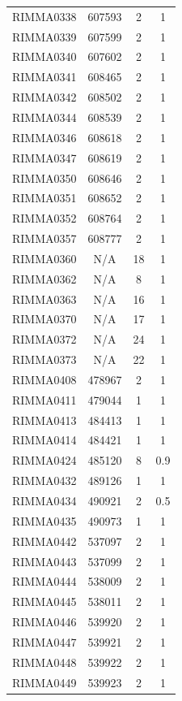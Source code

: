 \documentclass[11pt]{article}
\newcounter{rowno}
\begin{document}
\begin{scriptsize}
\begin{longtable}{>{\stepcounter{rowno}}cccc}
    RIMMA0338 & 607593 & 2     & 1 \\
    RIMMA0339 & 607599 & 2     & 1 \\
    RIMMA0340 & 607602 & 2     & 1 \\
    RIMMA0341 & 608465 & 2     & 1 \\
    RIMMA0342 & 608502 & 2     & 1 \\
    RIMMA0344 & 608539 & 2     & 1 \\
    RIMMA0346 & 608618 & 2     & 1 \\
    RIMMA0347 & 608619 & 2     & 1 \\
    RIMMA0350 & 608646 & 2     & 1 \\
    RIMMA0351 & 608652 & 2     & 1 \\
    RIMMA0352 & 608764 & 2     & 1 \\
    RIMMA0357 & 608777 & 2     & 1 \\
    RIMMA0360 & N/A & 18    & 1 \\
    RIMMA0362 & N/A & 8     & 1 \\
    RIMMA0363 & N/A & 16    & 1 \\
    RIMMA0370 & N/A & 17    & 1 \\
    RIMMA0372 & N/A & 24    & 1 \\
    RIMMA0373 & N/A & 22    & 1 \\
    RIMMA0408 & 478967 & 2     & 1 \\
    RIMMA0411 & 479044 & 1     & 1 \\
    RIMMA0413 & 484413 & 1     & 1 \\
    RIMMA0414 & 484421 & 1     & 1 \\
    RIMMA0424 & 485120 & 8     & 0.9 \\
    RIMMA0432 & 489126 & 1     & 1 \\
    RIMMA0434 & 490921 & 2     & 0.5 \\
    RIMMA0435 & 490973 & 1     & 1 \\
    RIMMA0442 & 537097 & 2     & 1 \\
    RIMMA0443 & 537099 & 2     & 1 \\
    RIMMA0444 & 538009 & 2     & 1 \\
    RIMMA0445 & 538011 & 2     & 1 \\
    RIMMA0446 & 539920 & 2     & 1 \\
    RIMMA0447 & 539921 & 2     & 1 \\
    RIMMA0448 & 539922 & 2     & 1 \\
    RIMMA0449 & 539923 & 2     & 1 \\

\end{longtable}
\end{scriptsize}
\end{document}
